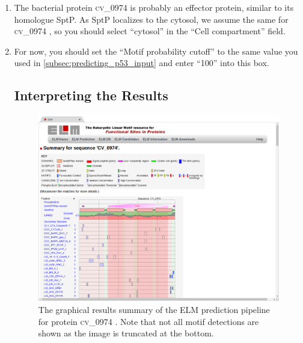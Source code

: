 \documentclass[12pt]{article}
\newcommand\uniprot[1]{%
	\textsc{\lowercase{#1}}%
}
\begin{document}
\begin{enumerate}

\item \label{subsec:predicting_cv_0974_search_compartment} The bacterial protein
\uniprot{CV\_0974} is probably an effector protein, similar to its homologue
SptP. As SptP localizes to the cytosol, we assume the same for \uniprot{CV\_0974},
so you should select ``cytosol'' in the ``Cell compartment'' field.


\item \label{subsec:predicting_cv_0974_search_cutoff} For now, you should set
    the ``Motif probability cutoff'' to the same value you used in
	\ref{subsec:predicting_p53_input} and enter ``100'' into this box.

\subsection*{Interpreting the Results}
\label{subsec:predicting_cv_0974_submitting}

\begin{figure}[h!]
	\centering
	\includegraphics[width=\textwidth]{Figures/29_elm_results_summary_good.png}
	\caption{
	The graphical results summary of the ELM prediction pipeline for
	protein \uniprot{CV\_0974}. Note that not all motif
	detections are shown as the image is truncated at the bottom.
	}
	\label{fig:predicting_cv_0974_results_summary}
\end{figure}


\end{enumerate}
\end{document}
